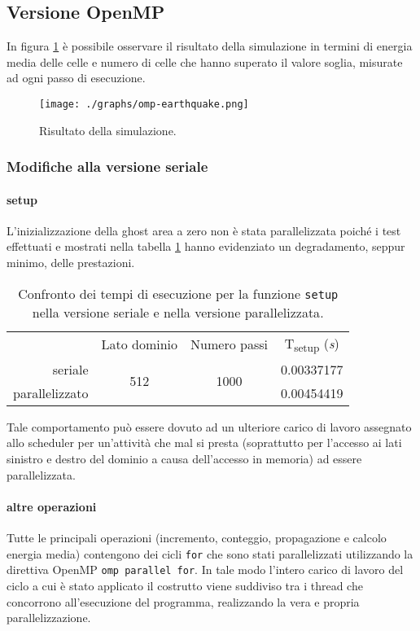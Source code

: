 \subsection{Versione OpenMP}

In figura \ref{fig:simulation1} è possibile osservare il risultato della
simulazione in termini di energia media delle celle e numero di celle che hanno
superato il valore soglia, misurate ad ogni passo di esecuzione.

\begin{figure}[!ht]
  \centering
  \texttt{[image: ./graphs/omp-earthquake.png]}
  \caption{Risultato della simulazione.}\label{fig:simulation1}
\end{figure}

\subsubsection{Modifiche alla versione seriale}

\paragraph{setup}L'inizializzazione della ghost area a zero non è stata
parallelizzata poiché i test effettuati e mostrati nella tabella
\ref{tab:parallelghostarea} hanno evidenziato un degradamento, seppur minimo,
delle prestazioni.

\begin{table}[ht]
\centering
\begin{tabular}{rccc}
\cmidrule[\heavyrulewidth]{2-4}
 & Lato dominio & Numero passi & T\textsubscript{setup} (\textit{s})\\
 \cmidrule[\lightrulewidth]{2-4}
 seriale & \multirow{2}{*}{512} & \multirow{2}{*}{1000} & 0.00337177\\
 parallelizzato &&& 0.00454419\\
\cmidrule[\heavyrulewidth]{2-4}
\end{tabular}
\caption{\label{tab:parallelghostarea}Confronto dei tempi di esecuzione per la
funzione \texttt{setup} nella versione seriale e nella versione parallelizzata.}
\end{table}

Tale comportamento può essere dovuto ad un ulteriore carico di lavoro assegnato
allo scheduler per un'attività che mal si presta (soprattutto per l'accesso ai
lati sinistro e destro del dominio a causa dell'accesso in memoria) ad essere
parallelizzata.

\paragraph{altre operazioni}
Tutte le principali operazioni (incremento, conteggio, propagazione e calcolo
energia media) contengono dei cicli \texttt{for} che sono stati parallelizzati
utilizzando la direttiva OpenMP \texttt{omp parallel for}.  In tale modo
l'intero carico di lavoro del ciclo a cui è stato applicato il costrutto viene
suddiviso tra i thread che concorrono all'esecuzione del programma, realizzando
la vera e propria parallelizzazione.

